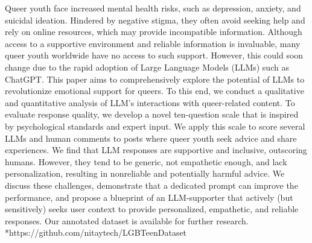 Queer youth face increased mental health risks, such as depression, anxiety, and suicidal ideation. Hindered by negative stigma, they often avoid seeking help and rely on online resources, which may provide incompatible information. Although access to a supportive environment and reliable information is invaluable, many queer youth worldwide have no access to such support. However, this could soon change due to the rapid adoption of Large Language Models (LLMs) such as ChatGPT. This paper aims to comprehensively explore the potential of LLMs to revolutionize emotional support for queers.  To this end, we conduct a qualitative and quantitative analysis of LLM's interactions with queer-related content. To evaluate response quality, we develop a novel ten-question scale that is inspired by psychological standards and expert input. We apply this scale to score several LLMs and human comments to posts where queer youth seek advice and share experiences.  We find that LLM responses are supportive and inclusive, outscoring humans. However, they tend to be generic, not empathetic enough, and lack personalization, resulting in nonreliable and potentially harmful advice.  We discuss these challenges, demonstrate that a dedicated prompt can improve the performance, and propose a blueprint of an LLM-supporter that actively (but sensitively) seeks user context to provide personalized, empathetic, and reliable responses.  Our annotated dataset is available for further research. *https://github.com/nitaytech/LGBTeenDataset